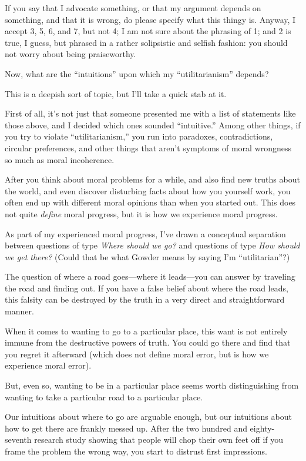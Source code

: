 {
 If you say that I advocate something, or that my argument depends
on something, and that it is wrong, do please specify what this thingy
is. Anyway, I accept 3, 5, 6, and 7, but not 4; I am not sure about the
phrasing of 1; and 2 is true, I guess, but phrased in a rather
solipsistic and selfish fashion: you should not worry about being
praiseworthy.}

{
 Now, what are the
``intuitions'' upon which my
``utilitarianism'' depends?}

{
 This is a deepish sort of topic, but I'll take a
quick stab at it.}

{
 First of all, it's not just that someone presented
me with a list of statements like those above, and I decided which ones
sounded ``intuitive.'' Among other
things, if you try to violate
``utilitarianism,'' you run into
paradoxes, contradictions, circular preferences, and other things that
aren't symptoms of moral wrongness so much as moral
incoherence.}

{
 After you think about moral problems for a while, and also find
new truths about the world, and even discover disturbing facts about
how you yourself work, you often end up with different moral opinions
than when you started out. This does not quite \textit{define} moral
progress, but it is how we experience moral progress.}

{
 As part of my experienced moral progress, I've
drawn a conceptual separation between questions of type \textit{Where
should we go?} and questions of type \textit{How should we get there?}
(Could that be what Gowder means by saying I'm
``utilitarian''?)}

{
 The question of where a road goes---where it leads---you can
answer by traveling the road and finding out. If you have a false
belief about where the road leads, this falsity can be destroyed by the
truth in a very direct and straightforward manner.}

{
 When it comes to wanting to go to a particular place, this want is
not entirely immune from the destructive powers of truth. You could go
there and find that you regret it afterward (which does not define
moral error, but is how we experience moral error).}

{
 But, even so, wanting to be in a particular place seems worth
distinguishing from wanting to take a particular road to a particular
place.}

{
 Our intuitions about where to go are arguable enough, but our
intuitions about how to get there are frankly messed up. After the two
hundred and eighty-seventh research study showing that people will chop
their own feet off if you frame the problem the wrong way, you start to
distrust first impressions.}

